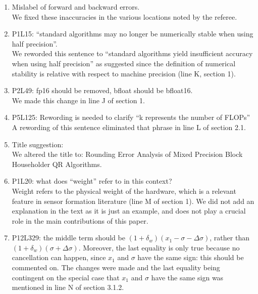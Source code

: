 \documentclass[10pt]{article}
\newcommand{\dd}{\delta}
\begin{document}
\begin{enumerate}
	\item Mislabel of forward and backward errors.\\
	{\normalfont
		We fixed these inaccuracies in the various locations noted by the referee.
	}
	\item P1L15: ``standard algorithms may no longer be numerically stable when using half precision''.\\
	{\normalfont
		We reworded this sentence to ``standard algorithms yield insufficient accuracy when using half precision'' as suggested since the definition of numerical stability is relative with respect to machine precision (line K, section 1).
	}
	\item P2L49: fp16 should be removed, bfloat should be bfloat16.\\
	{\normalfont
		We made this change in line J of section 1.
	}
	\item P5L125: Rewording is needed to clarify ``k represents the number of FLOPs'' \\
	{\normalfont
		A rewording of this sentence eliminated that phrase in line L of section 2.1. 
	}
	\item Title suggestion:\\
	{\normalfont
		We altered the title to: Rounding Error Analysis of Mixed Precision Block Householder QR Algorithms.
	}
	\item P1L20: what does ``weight'' refer to in this context?\\
	{\normalfont
		Weight refers to the physical weight of the hardware, which is a relevant feature in sensor formation literature (line M of section 1).
		We did not add an explanation in the text as it is just an example, and does not play a crucial role in the main contributions of this paper.
	}
%		
	\item P12L329: the middle term should be $(1+\dd_w)(x_1-\sigma-\Delta\sigma)$, rather than $(1+\dd_w)(\sigma+\Delta\sigma)$. Moreover, the last equality is only true because no cancellation can happen, since $x_1$ and $\sigma$ have the same sign: this should be commented on.
	{\normalfont
	The changes were made and the last equality being contingent on the special case that $x_1$ and $\sigma$ have the same sign was mentioned in line N of section 3.1.2.
}
\end{enumerate}
\end{document}
